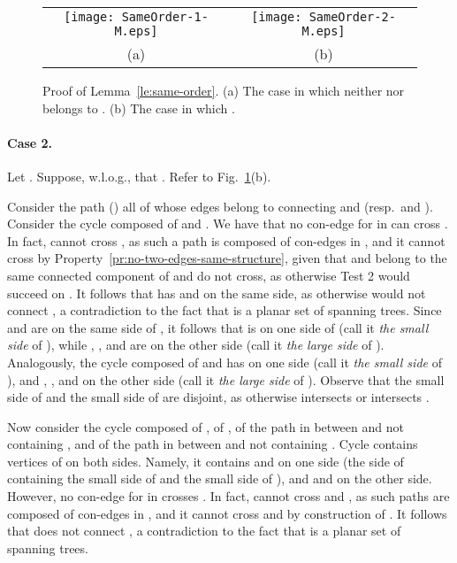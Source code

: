 \documentclass[letter,runningheads]{llncs}
\renewenvironment{proof}
{{\em Proof.\ }}{\hspace*{\fill}\par\vspace{2mm}}
\begin{document}
\begin{proof}
\begin{figure}[tb]
\begin{center}
\begin{tabular}{c c}
\mbox{\texttt{[image: SameOrder-1-M.eps]}} \hspace{1mm} &
\mbox{\texttt{[image: SameOrder-2-M.eps]}}\\
(a) \hspace{1mm} & (b)
\end{tabular}
\caption{Proof of Lemma~\ref{le:same-order}. (a) The case in which neither  nor  belongs to . (b) The case in which .}
\label{fig:same-order}
\end{center}
\end{figure}

\paragraph{Case 2.} Let . Suppose, w.l.o.g., that . Refer to Fig.~\ref{fig:same-order}(b).

Consider the path  () all of whose edges belong to  connecting  and  (resp.\  and ). Consider the cycle  composed of  and . We have that no con-edge  for  in  can cross . In fact,  cannot cross , as such a path is composed of con-edges in , and it cannot cross  by Property~\ref{pr:no-two-edges-same-structure}, given that  and  belong to the same connected component of  and do not cross, as otherwise {\sc Test 2} would succeed on . It follows that  has  and  on the same side, as otherwise  would not connect , a contradiction to the fact that  is a planar set of spanning trees. Since  and  are on the same side of , it follows that  is on one side of  (call it {\em the small side} of ), while , , and  are on the other side (call it {\em the large side} of ). Analogously, the cycle  composed of  and  has  on one side (call it {\em the small side} of ), and , , and  on the other side (call it {\em the large side} of ). Observe that the small side of  and the small side of  are disjoint, as otherwise  intersects  or  intersects .

Now consider the cycle  composed of , of , of the path  in  between  and  not containing , and of the path  in  between  and  not containing . Cycle  contains vertices of  on both sides. Namely, it contains  and  on one side (the side of  containing the small side of  and the small side of ), and  and  on the other side. However, no con-edge  for  in  crosses . In fact,  cannot cross  and , as such paths are composed of con-edges in , and it cannot cross  and  by construction of . It follows that  does not connect , a contradiction to the fact that  is a planar set of spanning trees.
\end{proof}
\end{document}
